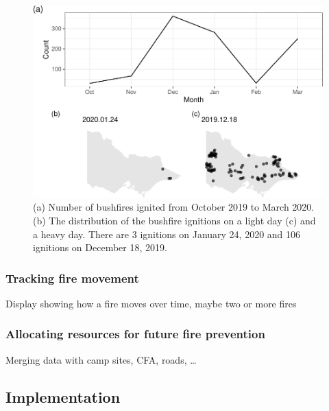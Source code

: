 \begin{Schunk}
\begin{figure}

{\centering \includegraphics[width=0.8\linewidth]{clustering_paper_files/figure-latex/app3-1} 

}

\caption[(a) Number of bushfires ignited from October 2019 to March 2020]{(a) Number of bushfires ignited from October 2019 to March 2020. (b) The distribution of the bushfire ignitions on a light day (c) and a heavy day. There are 3 ignitions on January 24, 2020 and 106 ignitions on December 18, 2019.}\label{fig:app3}
\end{figure}
\end{Schunk}

\hypertarget{tracking-fire-movement}{%
\subsubsection{Tracking fire movement}\label{tracking-fire-movement}}

Display showing how a fire moves over time, maybe two or more fires

\hypertarget{allocating-resources-for-future-fire-prevention}{%
\subsubsection{Allocating resources for future fire
prevention}\label{allocating-resources-for-future-fire-prevention}}

Merging data with camp sites, CFA, roads, \ldots{}

\hypertarget{implementation}{%
\subsection{Implementation}\label{implementation}}

